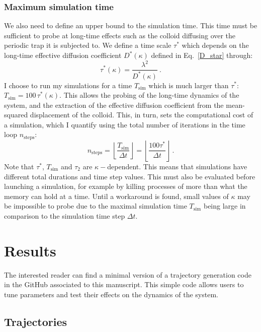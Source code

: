 \subsubsection{Maximum simulation time}
We also need to define an upper bound to the simulation time. This time must be sufficient to probe at long-time effects such as the colloid diffusing over the periodic trap it is subjected to. We define a time scale $\tau^*$ which depends on the long-time effective diffusion coefficient $D^*(\kappa)$ defined in Eq.~\ref{D_star} through:
\begin{equation}
    \tau^*(\kappa) = \dfrac{\lambda^2}{D^*(\kappa)}~.
\end{equation}
I choose to run my simulations for a time $T_\mathrm{sim}$ which is much larger than $\tau^*$: $T_\mathrm{sim} = 100 \, \tau^*(\kappa)$. This allows the probing of the long-time dynamics of the system, and the extraction of the effective diffusion coefficient from the mean-squared displacement of the colloid. This, in turn, sets the computational cost of a simulation, which I quantify using the total number of iterations in the time loop $n_\mathrm{steps}$:
\begin{equation}
    n_\mathrm{steps} = \left\lfloor \dfrac{T_\mathrm{sim}}{\Delta t} \right\rfloor = \left\lfloor \dfrac{100 \tau^*}{\Delta t} \right\rfloor~ .
\end{equation}
Note that $\tau^*$, $T_\mathrm{sim}$ and $\tau_2$ are $\kappa-$dependent. This means that simulations have different total durations and time step values. This must also be evaluated before launching a simulation, for example by killing processes of more than what the memory can hold at a time. Until a workaround is found, small values of $\kappa$ may be impossible to probe due to the maximal simulation time $T_\mathrm{sim}$ being large in comparison to the simulation time step $\Delta t$.  


\section{Results}
The interested reader can find a minimal version of a trajectory generation code in the GitHub associated to this manuscript. This simple code allows users to tune parameters and test their effects on the dynamics of the system.

\subsection{Trajectories}

